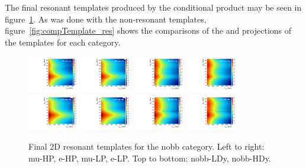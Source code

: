 The final resonant templates produced by the conditional product may be seen in figure~\ref{fig:template_res_Run2}.
As was done with the non-resonant templates, figure~\ref{fig:compTemplate_res} shows the comparisons of the \MVV and \MJ projections of the templates for each category.

\begin{figure}[htbp]
  \centering
  \includegraphics[width=0.2\textwidth]{fig/2Dfit/template_res_mu_HP_nobb_LDy.pdf}
  \includegraphics[width=0.2\textwidth]{fig/2Dfit/template_res_e_HP_nobb_LDy.pdf}
  \includegraphics[width=0.2\textwidth]{fig/2Dfit/template_res_mu_LP_nobb_LDy.pdf}
  \includegraphics[width=0.2\textwidth]{fig/2Dfit/template_res_e_LP_nobb_LDy.pdf}\\
  \includegraphics[width=0.2\textwidth]{fig/2Dfit/template_res_mu_HP_nobb_HDy.pdf}
  \includegraphics[width=0.2\textwidth]{fig/2Dfit/template_res_e_HP_nobb_HDy.pdf}
  \includegraphics[width=0.2\textwidth]{fig/2Dfit/template_res_mu_LP_nobb_HDy.pdf}
  \includegraphics[width=0.2\textwidth]{fig/2Dfit/template_res_e_LP_nobb_HDy.pdf}\\
  \caption{
    Final 2D resonant templates for the nobb category.
    Left to right: mu-HP, e-HP, mu-LP, e-LP.
    Top to bottom: nobb-LDy, nobb-HDy.
  }
  \label{fig:template_res_Run2}
\end{figure}

